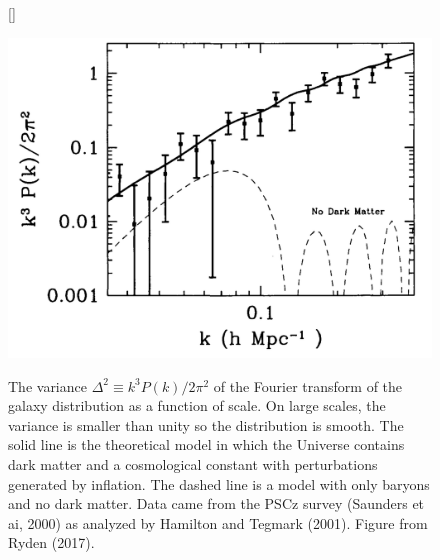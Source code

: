 \documentclass[a4paper,11pt]{article}
\begin{document}
\begin{figure}[t]
    [\FBwidth]
    {\caption{\footnotesize{The variance $\Delta^2 \equiv k^3P(k)/2\pi^2$ of the Fourier transform of the galaxy distribution as a function of scale. On large scales, the variance is smaller than unity so the distribution is smooth. The solid line is the theoretical model in which the Universe contains dark matter and a cosmological constant with perturbations generated by inflation. The dashed line is a model with only baryons and no dark matter. Data came from the PSCz survey (Saunders et ai, 2000) as analyzed by Hamilton and Tegmark (2001). Figure from Ryden (2017).}}
    \label{fig:galaxypowerspec}}
    {\includegraphics[width=12cm]{figures/GalaxyPowerSpectrum.png}}
\end{figure}
\end{document}
